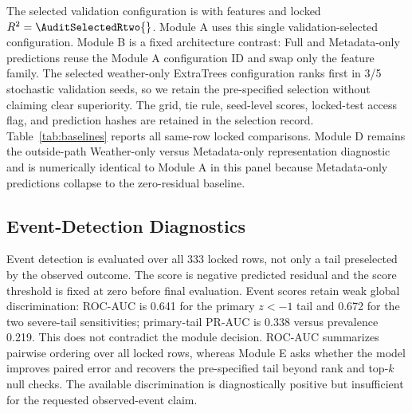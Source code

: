 \documentclass[conference]{IEEEtran}
\begin{document}
The selected validation configuration is \AuditSelectedModel{} with
\AuditSelectedFamily{} features and locked $R^2=\AuditSelectedRtwo{}$. Module A
uses this single validation-selected configuration. Module B is a fixed
architecture contrast: Full and Metadata-only predictions reuse the Module A
configuration ID and swap only the feature family. The selected weather-only
ExtraTrees configuration ranks first in 3/5 stochastic validation seeds, so we
retain the pre-specified selection without claiming clear superiority. The grid,
tie rule, seed-level scores, locked-test access flag, and prediction hashes are
retained in the selection record. Table~\ref{tab:baselines} reports all same-row
locked comparisons. Module D remains the outside-path Weather-only versus
Metadata-only representation diagnostic and is numerically identical to Module A
in this panel because Metadata-only predictions collapse to the zero-residual
baseline.

\begin{table}[t]
\centering
\caption{Locked 2016--2025 same-task audit. Learned-model predictions are seed
aggregated. $\Delta$RMSE is model minus zero-residual RMSE with paired 95\%
year-block intervals; RMSE is t ha$^{-1}$. The Module B contrast is computed
directly as Full-minus-Metadata; in this panel it matches Full-minus-zero
because Metadata-only predictions coincide with the zero-residual vector to
floating-point precision.}
\label{tab:baselines}
\scriptsize
\resizebox{\textwidth}{!}{}
\end{table}

\subsection{Event-Detection Diagnostics}
Event detection is evaluated over all 333 locked rows, not only a tail preselected
by the observed outcome. The score is negative predicted residual and the score
threshold is fixed at zero before final evaluation. Event scores retain weak
global discrimination: ROC-AUC is 0.641 for the primary $z<-1$ tail and 0.672 for
the two severe-tail sensitivities; primary-tail PR-AUC is 0.338 versus prevalence
0.219. This does not contradict the module decision. ROC-AUC summarizes pairwise
ordering over all locked rows, whereas Module E asks whether the model improves
paired error and recovers the pre-specified tail beyond rank and top-$k$ null
checks. The available discrimination is diagnostically positive but insufficient
for the requested observed-event claim.
\end{document}

